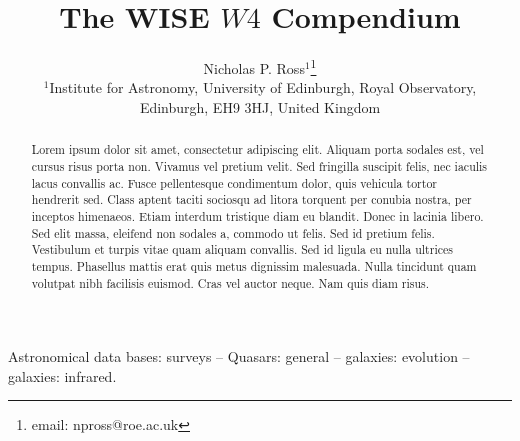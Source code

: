 \documentclass[usenatbib]{mn2e}
\begin{document}
\title[Odd page Title.]
      {The WISE $W4$ Compendium}
\author[N.P. Ross et al.]
       {Nicholas P. Ross$^{1}$\thanks{email: npross@roe.ac.uk}\\ 
$^1$Institute for Astronomy, University of Edinburgh, Royal Observatory, Edinburgh, EH9 3HJ, United Kingdom\\
}

\maketitle
\begin{abstract}
Lorem ipsum dolor sit amet, consectetur adipiscing elit. Aliquam porta
sodales est, vel cursus risus porta non. Vivamus vel pretium
velit. Sed fringilla suscipit felis, nec iaculis lacus convallis
ac. Fusce pellentesque condimentum dolor, quis vehicula tortor
hendrerit sed. Class aptent taciti sociosqu ad litora torquent per
conubia nostra, per inceptos himenaeos. Etiam interdum tristique diam
eu blandit. Donec in lacinia libero.
Sed elit massa, eleifend non sodales a, commodo ut felis. Sed id
pretium felis. Vestibulum et turpis vitae quam aliquam convallis. Sed
id ligula eu nulla ultrices tempus. Phasellus mattis erat quis metus
dignissim malesuada. Nulla tincidunt quam volutpat nibh facilisis
euismod. Cras vel auctor neque. Nam quis diam risus.
\end{abstract}


\begin{keywords}
Astronomical data bases: surveys -- 
Quasars: general -- 
galaxies: evolution -- 
galaxies: infrared.
\end{keywords}



\end{document}
